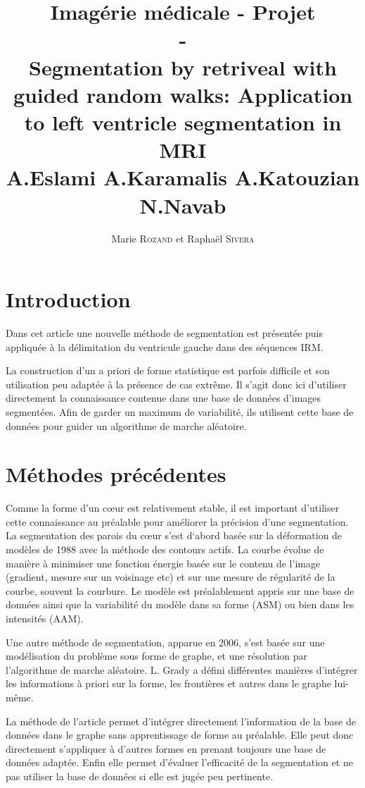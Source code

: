 \documentclass{article}
\title{Imagérie médicale - Projet \\ - \\ \small{Segmentation by retriveal with guided random walks: Application to left ventricle segmentation in MRI \\ A.Eslami A.Karamalis A.Katouzian N.Navab}}
\author{Marie \textsc{Rozand} et Raphaël \textsc{Sivera}}
\begin{document}
\maketitle

\section{Introduction}

Dans cet article une nouvelle méthode de segmentation est présentée puis appliquée à la délimitation du ventricule gauche dans des séquences IRM.

La construction d'un a priori de forme statistique est parfois difficile et son utilisation peu adaptée à la présence de cas extrême. Il s'agit donc ici d'utiliser directement la connaissance contenue dans une base de données d'images segmentées. Afin de garder un maximum de variabilité, ils utilisent cette base de données pour guider un algorithme de marche aléatoire.


\section{Méthodes précédentes}

Comme la forme d’un cœur est relativement stable, il est important d’utiliser cette connaissance au préalable pour améliorer la précision d’une segmentation. La segmentation des parois du cœur s’est d‘abord basée sur la déformation de modèles de 1988 avec la méthode des contours actifs. La courbe évolue de manière à minimiser une fonction énergie basée sur le contenu de l’image (gradient, mesure sur un voisinage etc) et sur une mesure de régularité de la courbe, souvent la courbure. Le modèle est préalablement appris sur une base de données ainsi que la variabilité du modèle dans sa forme (ASM) ou bien dans les intensités (AAM).

Une autre méthode de segmentation, apparue en 2006, s’est basée sur une modélisation du problème sous forme de graphe, et une résolution par l’algorithme de marche aléatoire. L. Grady a défini différentes manières d’intégrer les informations à priori sur la forme, les frontières et autres dans le graphe lui-même.

La méthode de l’article permet d’intégrer directement l’information de la base de données dans le graphe sans apprentissage de forme au préalable. Elle peut donc directement s’appliquer à d’autres formes en prenant toujours une base de données adaptée. Enfin elle permet d’évaluer l’efficacité de la segmentation et ne pas utiliser la base de données si elle est jugée peu pertinente.
\end{document}
